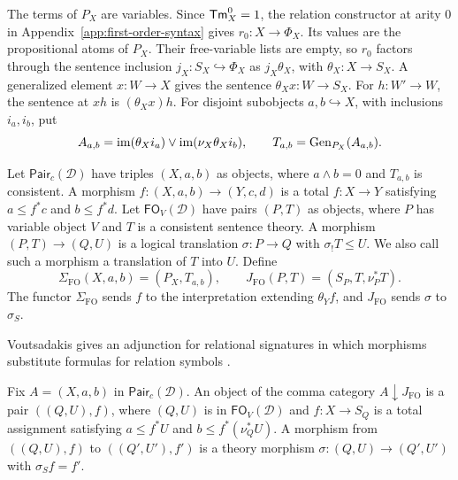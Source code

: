 The terms of $P_X$ are variables. Since $\mathsf{Tm}_X^0=1$, the relation
constructor at arity $0$ in Appendix~\ref{app:first-order-syntax}
gives $r_0:X\to\Phi_X$. Its values are the propositional atoms of $P_X$.
Their free-variable lists are empty, so $r_0$ factors through the
sentence inclusion $j_X:S_X\hookrightarrow\Phi_X$ as
$j_X\theta_X$, with $\theta_X:X\to S_X$.
A generalized element $x:W\to X$ gives the sentence
$\theta_Xx:W\to S_X$. For $h:W'\to W$, the sentence at $xh$ is
$(\theta_Xx)h$.
For disjoint subobjects $a,b\hookrightarrow X$, with inclusions
$i_a,i_b$, put
\[
 A_{a,b}=\operatorname{im}(\theta_Xi_a)\vee\operatorname{im}(\nu_X\theta_Xi_b),
 \qquad T_{a,b}=\operatorname{Gen}_{P_X}(A_{a,b}).
\]

Let $\mathsf{Pair}_c(\mathcal D)$ have triples $(X,a,b)$ as
objects, where $a\wedge b=0$ and $T_{a,b}$ is consistent. A
morphism $f:(X,a,b)\to(Y,c,d)$ is a total $f:X\to Y$ satisfying
$a\leq f^*c$ and $b\leq f^*d$.
Let $\mathsf{FO}_V(\mathcal D)$ have pairs $(P,T)$ as objects,
where $P$ has variable object $V$ and $T$ is a consistent
sentence theory. A morphism $(P,T)\to(Q,U)$ is a logical
translation $\sigma:P\to Q$ with $\sigma_!T\leq U$.
We also call such a morphism a translation of $T$ into $U$.
Define
\[
 \Sigma_{\mathrm{FO}}(X,a,b)=(P_X,T_{a,b}),\qquad
 J_{\mathrm{FO}}(P,T)=(S_P,T,\nu_P^*T).
\]
The functor $\Sigma_{\mathrm{FO}}$ sends $f$ to the interpretation
extending $\theta_Yf$, and $J_{\mathrm{FO}}$ sends $\sigma$ to
$\sigma_S$.

Voutsadakis gives an adjunction for relational signatures in which
morphisms substitute formulas for relation symbols
\cite[Theorem~7]{Voutsadakis}.

Fix $A=(X,a,b)$ in $\mathsf{Pair}_c(\mathcal D)$. An object of the
comma category $A\downarrow J_{\mathrm{FO}}$ is a pair $((Q,U),f)$,
where $(Q,U)$ is in $\mathsf{FO}_V(\mathcal D)$ and $f:X\to S_Q$ is
a total assignment satisfying $a\leq f^*U$ and $b\leq f^*(\nu_Q^*U)$.
A morphism from $((Q,U),f)$ to $((Q',U'),f')$ is a theory morphism
$\sigma:(Q,U)\to(Q',U')$ with $\sigma_S f=f'$.

